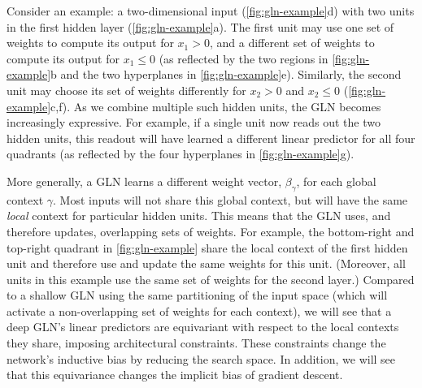 \documentclass{article}
\theoremstyle{plain}
\theoremstyle{definition}
\theoremstyle{remark}
\begin{document}
Consider an example: a two-dimensional input (\cref{fig:gln-example}d) with two units in the first hidden layer (\cref{fig:gln-example}a).
The first unit may use one set of weights to compute its output for $x_1>0$, and a different set of weights to compute its output for $x_1\leq 0$ (as reflected by the two regions in \cref{fig:gln-example}b and the two hyperplanes in \cref{fig:gln-example}e).
Similarly, the second unit may choose its set of weights differently for $x_2>0$ and $x_2\leq 0$ (\cref{fig:gln-example}c,f).
As we combine multiple such hidden units, the GLN becomes increasingly expressive.
For example, if a single unit now reads out the two hidden units, this readout will have learned a different linear predictor for all four quadrants (as reflected by the four hyperplanes in \cref{fig:gln-example}g).



More generally, a GLN learns a different weight vector, $\beta_{\gamma}$, for each global context $\gamma$.
Most inputs will not share this global context, but will have the same \emph{local} context for particular hidden units.
This means that the GLN uses, and therefore updates, overlapping sets of weights.
For example, the bottom-right and top-right quadrant in \cref{fig:gln-example} share the local context of the first hidden unit and therefore use and update the same weights for this unit.
(Moreover, all units in this example use the same set of weights for the second layer.)
Compared to a shallow GLN using the same partitioning of the input space (which will activate a non-overlapping set of weights for each context), we will see that a deep GLN's linear predictors are equivariant with respect to the local contexts they share, imposing architectural constraints.
These constraints change the network's inductive bias by reducing the search space.
In addition, we will see that this equivariance changes the implicit bias of gradient descent.
\end{document}
